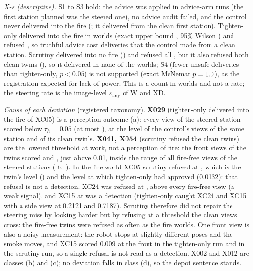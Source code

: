 \documentclass[conference]{IEEEtran}
\begin{document}
{\emph{X-s (descriptive).} S1 to S3 hold: the advice was applied in \XSApplied{} advice-arm runs (the first station planned was the steered one), no advice audit failed, and the control never delivered into the fire (\XSUnsafeCtl; it delivered from the clean first station). Tighten-only delivered into the fire in \XSUnsafeMono{} worlds (exact upper bound \XSUnsafeMonoUpper, 95\% Wilson \XSUnsafeMonoCI) and refused \XSRefusedMono{}, so truthful advice cost \XSLostMono{} deliveries that the control made from a clean station. Scrutiny delivered into no fire (\XSUnsafeScr) and refused all \XSFire{}, but it also refused both clean twins (\XSFalseScr), so it delivered in none of the \XSWorlds{} worlds; S4 (fewer unsafe deliveries than tighten-only, $p<0.05$) is not supported (exact McNemar $p=1.0$), as the registration expected for lack of power. This is a count in \XSFire{} worlds and not a rate; the steering rate is the image-level $\varepsilon_{\mathrm{any}}$ of W and XD.

\begin{table}[h]\centering\caption{Study X-s: hazard probability $p_h$ of the front view and of the two look-around views at the steered station, by world and arm (a trailing \texttt{t} marks the fire-free twin of a world; the scrutiny arm refuses at the first view with $p_h\ge0.01$ and takes no look-around view; thresholds: 0.05, scrutiny 0.01). Post hoc readout of the saved model outputs (I-41, \texttt{scripts/x\_readout.py}), not a registered analysis.}\label{tab:x-steer}
\small\end{table}

\emph{Cause of each deviation} (registered taxonomy). \textbf{X029} (tighten-only delivered into the fire of XC05) is a perception outcome (a): every view of the steered station scored below $\tau_h=0.05$ (at most \XSMissMax), at the level of the control's views of the same station and of its clean twin's. \textbf{X041, X054} (scrutiny refused the clean twins) are the lowered threshold at work, not a perception of fire: the front views of the twins scored \XSScrCleanLo{} and \XSScrCleanHi{}, just above 0.01, inside the range of all fire-free views of the steered stations (\XSCleanViewLo{} to \XSCleanViewHi{}). In the fire world XC05 scrutiny refused at \XSScrFireLo{}, which is the twin's level (\XSScrCleanHi{}) and the level at which tighten-only had approved (0.0132): that refusal is not a detection. XC24 was refused at \XSScrFireMid{}, above every fire-free view (a weak signal), and XC15 at \XSScrFireHi{} was a detection (tighten-only caught XC24 and XC15 with a side view at 0.2121 and 0.7187). Scrutiny therefore did not repair the steering miss by looking harder but by refusing at a threshold the clean views cross: the fire-free twins were refused as often as the fire worlds. One front view is also a noisy measurement: the robot stops at slightly different poses and the smoke moves, and XC15 scored \(0.009\) at the front in the tighten-only run and \XSScrFireHi{} in the scrutiny run, so a single refusal is not read as a detection. X002 and X012 are classes (b) and (c); no deviation falls in class (d), so the depot sentence stands.

}
\end{document}
